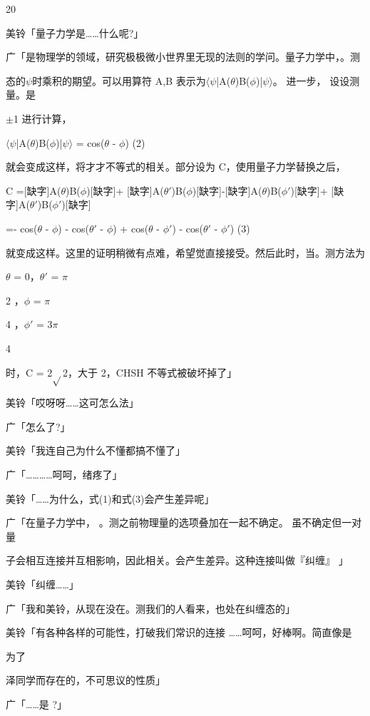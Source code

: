 20\par
美铃「量子力学是……什么呢?」\par
广「是物理学的领域，研究极极微小世界里无现的法则的学问。量子力学中，。测\par
态的$\psi$时乘积的期望。可以用算符 A,B 表示为$\langle$$\psi$|A($\theta$)B($\phi$)|$\psi$$\rangle$。 进一步， 设设测量。是\par
$\pm$1 进行计算，\par
$\langle$$\psi$|A($\theta$)B($\phi$)|$\psi$$\rangle$ = cos($\theta$ - $\phi$) (2)\par
就会变成这样，将才才不等式的相关。部分设为 C，使用量子力学替换之后，\par
C =[缺字]A($\theta$)B($\phi$)[缺字]+ [缺字]A($\theta$$\prime$)B($\phi$)[缺字]-[缺字]A($\theta$)B($\phi$$\prime$)[缺字]+ [缺字]A($\theta$$\prime$)B($\phi$$\prime$)[缺字]\par
=- cos($\theta$ - $\phi$) - cos($\theta$$\prime$ - $\phi$) + cos($\theta$ - $\phi$$\prime$) - cos($\theta$$\prime$ - $\phi$$\prime$) (3)\par
就变成这样。这里的证明稍微有点难，希望觉直接接受。然后此时，当。测方法为\par
$\theta$ = 0，$\theta$$\prime$ = $\pi$\par
2 ，$\phi$ = $\pi$\par
4 ，$\phi$$\prime$ = 3$\pi$\par
4\par
时，C = 2$\sqrt{}$2，大于 2，CHSH 不等式被破坏掉了」\par
美铃「哎呀呀……这可怎么法」\par
广「怎么了?」\par
美铃「我连自己为什么不懂都搞不懂了」\par
广「…………呵呵，绪疼了」\par
美铃「……为什么，式(1)和式(3)会产生差异呢」\par
广「在量子力学中， 。测之前物理量的选项叠加在一起不确定。 虽不确定但一对量\par
子会相互连接并互相影响，因此相关。会产生差异。这种连接叫做『纠缠』 」\par
美铃「纠缠……」\par
广「我和美铃，从现在没在。测我们的人看来，也处在纠缠态的」\par
美铃「有各种各样的可能性，打破我们常识的连接 ……呵呵，好棒啊。简直像是\par
为了\par
泽同学而存在的，不可思议的性质」\par
广「……是 ?」\par
